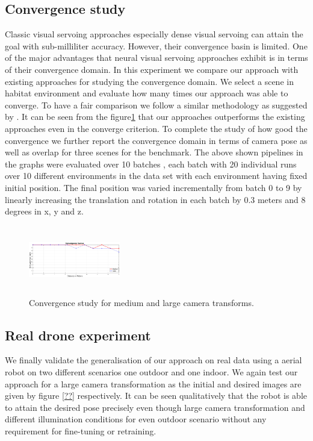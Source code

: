 \documentclass[letterpaper, 10 pt, conference]{ieeeconf}  %
\begin{document}
\subsection{Convergence study}
Classic visual servoing approaches especially dense visual servoing can attain the goal with sub-milliliter accuracy. However, their convergence basin is limited. One of the major advantages that neural visual servoing   approaches exhibit is in terms of their convergence domain. In this experiment we compare our approach with existing approaches for studying the convergence domain. We select a scene in habitat environment and evaluate how many times our approach was able to converge. To have a fair comparison we follow a similar methodology as suggested by \cite{trainingdeepvs}. It can be seen from the figure\ref{fig:convergence} that our approaches outperforms the existing approaches even in the converge criterion. To complete the study of how good the convergence we further report the convergence domain in terms of camera pose as well as overlap for three scenes for the benchmark.
The above shown pipelines in the graphs were evaluated over 10 batches , each batch with 20 individual runs over 10 different environments in the data set with each environment having fixed initial position. The final position was varied incrementally from batch 0 to 9 by linearly increasing the translation and rotation in  each batch by 0.3 meters and 8 degrees in x, y and z.  
\begin{figure}%
\centering
\includegraphics[width=4cm, height=3cm] {stability_convergence/convergence_2.eps}
\caption{Convergence study for medium and large camera transforms.}
\label{fig:convergence}
\end{figure}
\subsection{Real drone experiment}
We finally validate the generalisation of our approach on real data using a aerial robot on two different scenarios one outdoor and one indoor. We again test our approach for a large camera transformation as the initial and desired images are given by figure \ref{??} respectively. It can be seen qualitatively that the robot is able to attain the desired pose precisely even though large camera transformation and different illumination conditions for even outdoor scenario without any requirement for fine-tuning or retraining.
\end{document}
